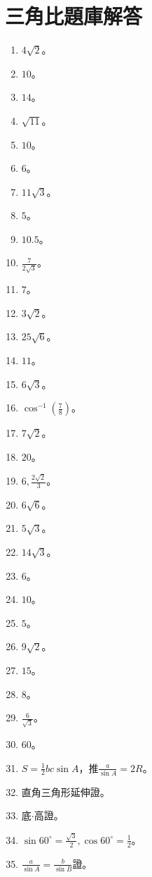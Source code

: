 \section{三角比題庫解答}
\begin{enumerate}[label=\arabic*.]
    \item $4\sqrt{2}$。
    \item $10$。
    \item $14$。
    \item $\sqrt{11}$。
    \item $10$。
    \item $6$。
    \item $11\sqrt{3}$。
    \item $5$。
    \item $10.5$。
    \item $\frac{7}{2\sqrt{3}}$。
    \item $7$。
    \item $3\sqrt{2}$。
    \item $25\sqrt{6}$。
    \item $11$。
    \item $6\sqrt{3}$。
    \item $\cos^{-1}(\frac{7}{8})$。
    \item $7\sqrt{2}$。
    \item $20$。
    \item $6, \frac{2\sqrt{2}}{3}$。
    \item $6\sqrt{6}$。
    \item $5\sqrt{3}$。
    \item $14\sqrt{3}$。
    \item $6$。
    \item $10$。
    \item $5$。
    \item $9\sqrt{2}$。
    \item $15$。
    \item $8$。
    \item $\frac{6}{\sqrt{3}}$。
    \item $60$。
    \item $S = \frac{1}{2}bc \sin A$，推$\frac{a}{\sin A} = 2R$。
    \item 直角三角形延伸證。
    \item 底$\cdot$高證。
    \item $\sin 60^\circ = \frac{\sqrt{3}}{2}, \cos 60^\circ = \frac{1}{2}$。
    \item $\frac{a}{\sin A} = \frac{b}{\sin B}$證。

\end{enumerate}
